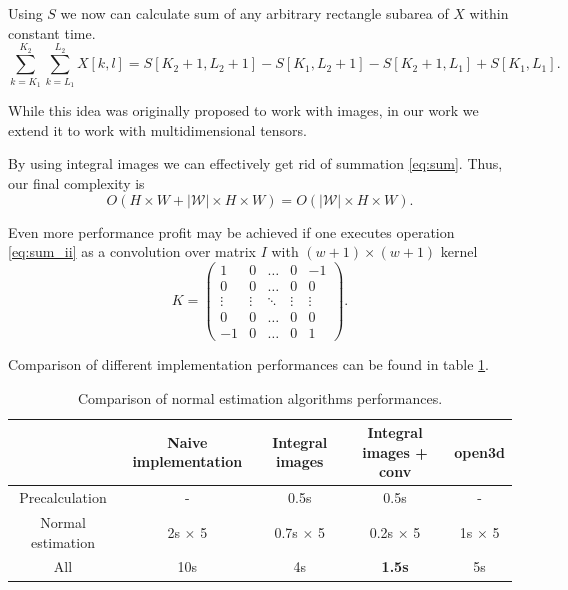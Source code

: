 Using $S$ we now can calculate sum of any arbitrary rectangle subarea of $X$ within constant time.
\begin{equation} \label{eq:sum_ii}
\sum_{k=K_1}^{K_2} \sum_{k=L_1}^{L_2} X[k,l] = S[K_2+1, L_2+1] - S[K_1, L_2+1] - S[K_2+1, L_1] + S[K_1, L_1].
\end{equation}

While this idea was originally proposed to work with images, in our work we extend it to work with multidimensional tensors.

By using integral images we can effectively get rid of summation \ref{eq:sum}. Thus, our final complexity is
\[
O\left(H \times W + \left|\mathcal{W}\right| \times H \times W \right) = O\left(\left|\mathcal{W}\right| \times H \times W \right).
\]

Even more performance profit may be achieved if one executes operation \ref{eq:sum_ii} as a convolution over matrix $I$ with $(w + 1) \times (w + 1)$ kernel 
\[
K = 
\begin{pmatrix}
1 & 0 & \dots & 0 & -1 \\
0 & 0 & \dots & 0 & 0 \\
\vdots & \vdots & \ddots & \vdots & \vdots \\
0 & 0 & \dots & 0 & 0 \\
-1 & 0 & \dots & 0 & 1
\end{pmatrix}.
\]

Comparison of different implementation performances can be found in table \ref{table:perf}.

\begin{table}
\centering
\begin{tabular}{ | c | c | c | c | c | }
 \hline
 & Naive implementation & Integral images & Integral images + conv & open3d \\ 
 \hline
 Precalculation & - & 0.5s & 0.5s  & - \\  
 \hline
 Normal estimation & 2s $\times$ 5  & 0.7s $\times$ 5  & 0.2s $\times$ 5 & 1s $\times$ 5 \\  
 \hline
 All & 10s & 4s  & \textbf{1.5s}  & 5s \\
 \hline
\end{tabular}
\caption{Comparison of normal estimation algorithms performances.}
\label{table:perf}
\end{table}